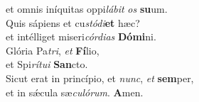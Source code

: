 \evenverse et omnis iníquitas oppi\textit{lá}\textit{bit} \textit{os} \textbf{su}um.\\
\oddverse Quis sápiens et cu\textit{stó}\textit{di}\textbf{et} hæc?~\*\\
\oddverse et intélliget miseri\textit{cór}\textit{di}\textit{as} \textbf{Dó}\textbf{mi}ni.\\
\evenverse Glória Pa\textit{tri}, \textit{et} \textbf{Fí}lio,~\*\\
\evenverse et Spi\textit{rí}\textit{tu}\textit{i} \textbf{San}cto.\\
\oddverse Sicut erat in princípio, et \textit{nunc}, \textit{et} \textbf{sem}per,~\*\\
\oddverse et in sǽcula sæ\textit{cu}\textit{ló}\textit{rum}. \textbf{A}men.\\
